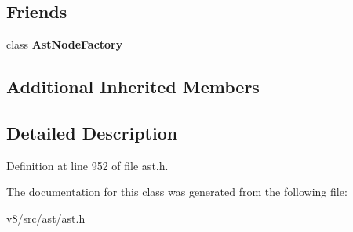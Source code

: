 \subsection*{Friends}
\begin{DoxyCompactItemize}
\item 
\mbox{\label{classv8_1_1internal_1_1TryCatchStatement_a8d587c8ad3515ff6433eb83c578e795f}} 
class {\bfseries Ast\+Node\+Factory}
\end{DoxyCompactItemize}
\subsection*{Additional Inherited Members}


\subsection{Detailed Description}


Definition at line 952 of file ast.\+h.



The documentation for this class was generated from the following file\+:\begin{DoxyCompactItemize}
\item 
v8/src/ast/ast.\+h\end{DoxyCompactItemize}
